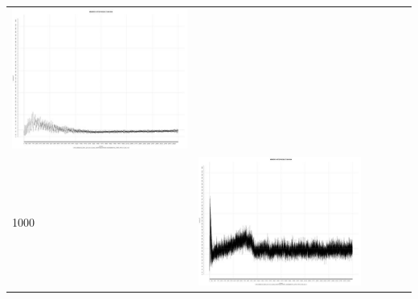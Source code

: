 \begin{table}[htbp]
{\begin{tabular}{l | ccccc}
\begin{minipage}{.15\textwidth}
     			 	\includegraphics[width=\linewidth]{images/mema-triple/I10}
    				 \end{minipage}\\	
		1000   &	 \begin{minipage}{.15\textwidth}
     			 	\includegraphics[width=\linewidth]{images/mema-triple/I4}
    				 \end{minipage}
    			   &	 \begin{minipage}{.15\textwidth}

\end{minipage}
\end{tabular}}
\end{table}
